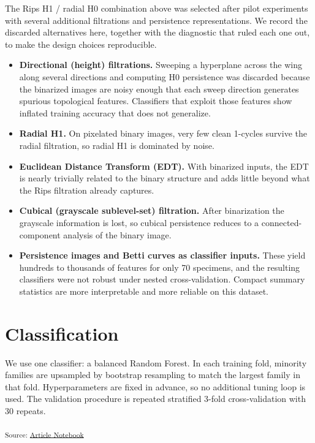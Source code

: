 \documentclass[
  a4paper,
  DIV=11,
  numbers=noendperiod]{scrartcl}
\providecommand{\tightlist}{%
  \setlength{\itemsep}{0pt}\setlength{\parskip}{0pt}}
\begin{document}
The Rips H1 / radial H0 combination above was selected after pilot
experiments with several additional filtrations and persistence
representations. We record the discarded alternatives here, together
with the diagnostic that ruled each one out, to make the design choices
reproducible.

\begin{itemize}
\tightlist
\item
  \textbf{Directional (height) filtrations.} Sweeping a hyperplane
  across the wing along several directions and computing H0 persistence
  was discarded because the binarized images are noisy enough that each
  sweep direction generates spurious topological features. Classifiers
  that exploit those features show inflated training accuracy that does
  not generalize.
\item
  \textbf{Radial H1.} On pixelated binary images, very few clean
  1-cycles survive the radial filtration, so radial H1 is dominated by
  noise.
\item
  \textbf{Euclidean Distance Transform (EDT).} With binarized inputs,
  the EDT is nearly trivially related to the binary structure and adds
  little beyond what the Rips filtration already captures.
\item
  \textbf{Cubical (grayscale sublevel-set) filtration.} After
  binarization the grayscale information is lost, so cubical persistence
  reduces to a connected-component analysis of the binary image.
\item
  \textbf{Persistence images and Betti curves as classifier inputs.}
  These yield hundreds to thousands of features for only 70 specimens,
  and the resulting classifiers were not robust under nested
  cross-validation. Compact summary statistics are more interpretable
  and more reliable on this dataset.
\end{itemize}

\section{Classification}\label{classification}

We use one classifier: a balanced Random Forest. In each training fold,
minority families are upsampled by bootstrap resampling to match the
largest family in that fold. Hyperparameters are fixed in advance, so no
additional tuning loop is used. The validation procedure is repeated
stratified 3-fold cross-validation with 30 repeats.

\textsubscript{Source:
\href{https://JuliaTDA.github.io/tda-fly/index.qmd.html}{Article
Notebook}}
\end{document}
